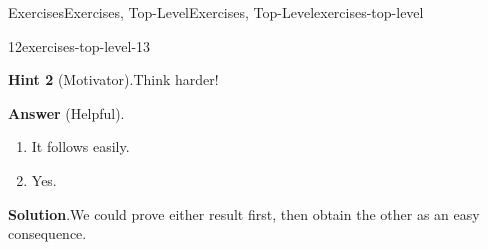 \documentclass[twoside,10pt,]{article}
\newcommand{\blocktitlefont}{\relax}
\numberwithin{equation}{section}
\begin{document}
\begin{exercises-section}{Exercises}{Exercises, Top-Level}{}{Exercises, Top-Level}{}{}{exercises-top-level}
\begin{divisionexercise}{12}{}{}{exercises-top-level-13}
\par\smallskip%
\noindent\textbf{\blocktitlefont Hint 2} (Motivator).\hypertarget{exercise-complicated-second-hint}{}\quad{}Think harder!%
\par\smallskip%
\noindent\textbf{\blocktitlefont Answer} (Helpful).\hypertarget{exercise-complicated-first-answer}{}\quad{}%
\begin{enumerate}[label={(\alph*)}]
\item{}It follows easily.%
\item{}Yes.%
\end{enumerate}
%
\par\smallskip%
\noindent\textbf{\blocktitlefont Solution}.\hypertarget{exercises-top-level-13-5}{}\quad{}We could prove either result first, then obtain the other as an easy consequence.%
\end{divisionexercise}%
\end{exercises-section}
%
\appendix%
%
%
%
%
\typeout{************************************************}
\typeout{************************************************}
%
\end{document}
